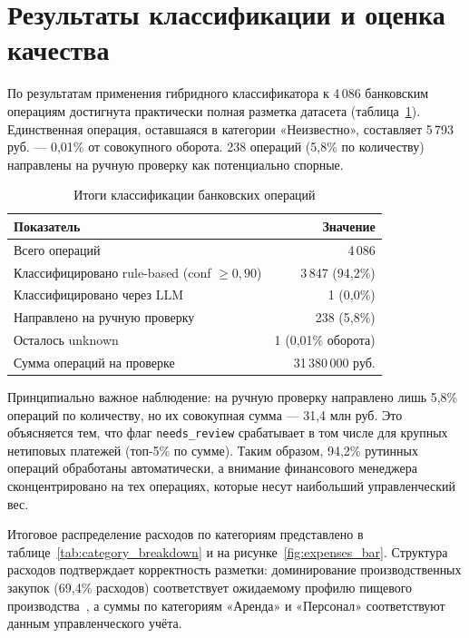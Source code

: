 \section{Результаты классификации и оценка качества}

По результатам применения гибридного классификатора к 4\,086 банковским операциям достигнута практически полная разметка датасета (таблица~\ref{tab:classification_results}). Единственная операция, оставшаяся в категории «Неизвестно», составляет 5\,793 руб. --- 0,01\% от совокупного оборота. 238 операций (5,8\% по количеству) направлены на ручную проверку как потенциально спорные.

\begin{table}[H]
\centering
\caption{Итоги классификации банковских операций}
\label{tab:classification_results}
\begin{tabular}{lr}
\toprule
\textbf{Показатель} & \textbf{Значение} \\
\midrule
Всего операций & 4\,086 \\
Классифицировано rule-based (conf $\geq 0{,}90$) & 3\,847 (94,2\%) \\
Классифицировано через LLM & 1 (0,0\%) \\
Направлено на ручную проверку & 238 (5,8\%) \\
Осталось unknown & 1 (0,01\% оборота) \\
Сумма операций на проверке & 31\,380\,000 руб. \\
\bottomrule
\end{tabular}
\end{table}

Принципиально важное наблюдение: на ручную проверку направлено лишь 5,8\% операций по количеству, но их совокупная сумма --- 31,4 млн руб. Это объясняется тем, что флаг \texttt{needs\_review} срабатывает в том числе для крупных нетиповых платежей (топ-5\% по сумме). Таким образом, 94,2\% рутинных операций обработаны автоматически, а внимание финансового менеджера сконцентрировано на тех операциях, которые несут наибольший управленческий вес.

Итоговое распределение расходов по категориям представлено в таблице~\ref{tab:category_breakdown} и на рисунке~\ref{fig:expenses_bar}. Структура расходов подтверждает корректность разметки: доминирование производственных закупок (69,4\% расходов) соответствует ожидаемому профилю пищевого производства~\cite{sme_profitability_ru}, а суммы по категориям «Аренда» и «Персонал» соответствуют данным управленческого учёта.

